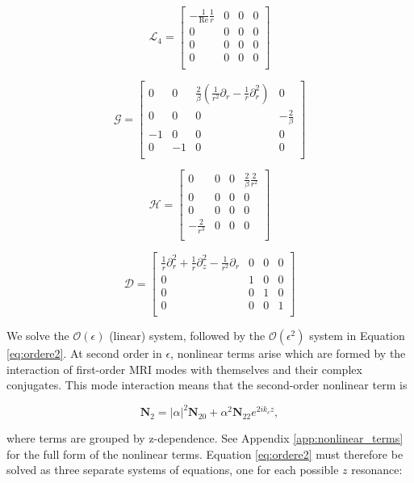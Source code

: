 \documentclass{emulateapj}
\newcommand{\beq}{\begin{equation}}
\newcommand{\eeq}{\end{equation}}
\newcommand\reye{\mathrm{Re}}
\begin{document}
\beq
\mathcal{L}_4 = \left[\begin{matrix}
-\frac{1}{\reye}\frac{1}{r} & 0 & 0 & 0 \\
0 & 0 & 0 & 0 \\
0 & 0 & 0 & 0 \\
0 & 0 & 0 & 0 \\
\end{matrix}\right]
\eeq

\beq
\mathcal{G} = \left[\begin{matrix}
0 & 0 & \frac{2}{\beta}(\frac{1}{r^2}\partial_r - \frac{1}{r}\partial_r^2) & 0 \\
0 & 0 & 0 & -\frac{2}{\beta} \\
-1 & 0 & 0 & 0 \\
0 & -1 & 0 & 0 \\
\end{matrix}\right]
\eeq

\beq
\mathcal{H} = \left[\begin{matrix}
0 & 0 & 0 & \frac{2}{\beta} \frac{2}{r^2} \\
0 & 0 & 0 & 0 \\
0 & 0 & 0 & 0 \\
-\frac{2}{r^3} & 0 & 0 & 0 \\
\end{matrix}\right]
\eeq

\beq
\mathcal{D} = \left[\begin{matrix}
\frac{1}{r}\partial_r^2 + \frac{1}{r}\partial_z^2 - \frac{1}{r^2}\partial_r & 0 & 0 & 0 \\
0 & 1 & 0 & 0 \\
0 & 0 & 1 & 0 \\
0 & 0 & 0 & 1 \\
\end{matrix}\right]
\eeq

We solve the $\mathcal{O}(\epsilon)$ (linear) system, followed by the $\mathcal{O}(\epsilon^2)$ system in Equation \ref{eq:ordere2}. At second order in $\epsilon$, nonlinear terms arise which are formed by the interaction of first-order MRI modes with themselves and their complex conjugates. This mode interaction means that the second-order nonlinear term is 

\beq
\mathbf{N}_2 = |\alpha|^2 \mathbf{N}_{20} + \alpha^2 \mathbf{N}_{22} e^{2 i k_c z},
\eeq

where terms are grouped by z-dependence. See Appendix \ref{app:nonlinear_terms} for the full form of the nonlinear terms. Equation \ref{eq:ordere2} must therefore be solved as three separate systems of equations, one for each possible $z$ resonance: 
\end{document}
